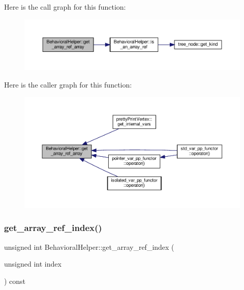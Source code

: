 Here is the call graph for this function\+:
\nopagebreak
\begin{figure}[H]
\begin{center}
\leavevmode
\includegraphics[width=350pt]{dd/db2/classBehavioralHelper_ae23d240480b0859b3bae1e63968a35d7_cgraph}
\end{center}
\end{figure}
Here is the caller graph for this function\+:
\nopagebreak
\begin{figure}[H]
\begin{center}
\leavevmode
\includegraphics[width=350pt]{dd/db2/classBehavioralHelper_ae23d240480b0859b3bae1e63968a35d7_icgraph}
\end{center}
\end{figure}
\mbox{\label{classBehavioralHelper_ae4927e97c38dcd00e2afabfd90290d3b}} 
\subsubsection{\texorpdfstring{get\+\_\+array\+\_\+ref\+\_\+index()}{get\_array\_ref\_index()}}
{\footnotesize\ttfamily unsigned int Behavioral\+Helper\+::get\+\_\+array\+\_\+ref\+\_\+index (\begin{DoxyParamCaption}\item[{unsigned int}]{index }\end{DoxyParamCaption}) const\hspace{0.3cm}{\ttfamily [virtual]}}



